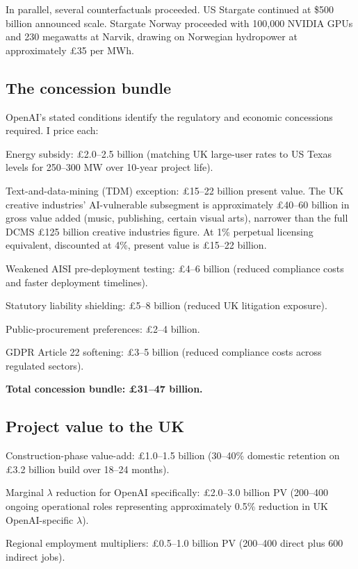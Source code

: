 \documentclass[11pt,letterpaper]{article}
\theoremstyle{remark}
\begin{document}
In parallel, several counterfactuals proceeded. {US} Stargate continued at \$500 billion announced scale. Stargate Norway proceeded with 100{,}000 NVIDIA {GPUs} and 230 megawatts at Narvik, drawing on Norwegian hydropower at approximately \pounds35 per {MWh}.

\subsection{The concession bundle}

OpenAI's stated conditions identify the regulatory and economic concessions required. I price each:

Energy subsidy: \pounds2.0--2.5 billion (matching {UK} large-user rates to {US} Texas levels for 250--300 {MW} over 10-year project life).

Text-and-data-mining ({TDM}) exception: \pounds15--22 billion present value. The {UK} creative industries' {AI}-vulnerable subsegment is approximately \pounds40--60 billion in gross value added (music, publishing, certain visual arts), narrower than the full {DCMS} \pounds125 billion creative industries figure. At 1\% perpetual licensing equivalent, discounted at 4\%, present value is \pounds15--22 billion.

Weakened {AISI} pre-deployment testing: \pounds4--6 billion (reduced compliance costs and faster deployment timelines).

Statutory liability shielding: \pounds5--8 billion (reduced {UK} litigation exposure).

Public-procurement preferences: \pounds2--4 billion.

{GDPR} Article 22 softening: \pounds3--5 billion (reduced compliance costs across regulated sectors).

\textbf{Total concession bundle: \pounds31--47 billion.}

\subsection{Project value to the {UK}}

Construction-phase value-add: \pounds1.0--1.5 billion (30--40\% domestic retention on \pounds3.2 billion build over 18--24 months).

Marginal $\lambda$ reduction for OpenAI specifically: \pounds2.0--3.0 billion {PV} (200--400 ongoing operational roles representing approximately 0.5\% reduction in {UK} OpenAI-specific $\lambda$).

Regional employment multipliers: \pounds0.5--1.0 billion {PV} (200--400 direct plus 600 indirect jobs).
\end{document}
